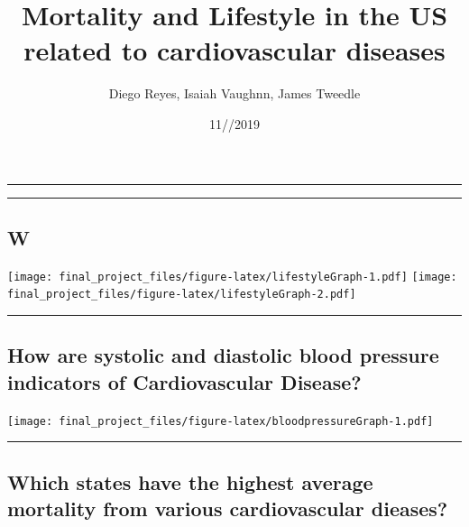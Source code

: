 \documentclass[]{article}
\title{Mortality and Lifestyle in the US related to cardiovascular diseases}
\author{Diego Reyes, Isaiah Vaughnn, James Tweedle}
\date{11//2019}
\begin{document}
\maketitle

\begin{center}\rule{0.5\linewidth}{\linethickness}\end{center}

\begin{center}\rule{0.5\linewidth}{\linethickness}\end{center}

\hypertarget{w}{%
\subsection{W}\label{w}}

\texttt{[image: final\_project\_files/figure-latex/lifestyleGraph-1.pdf]}
\texttt{[image: final\_project\_files/figure-latex/lifestyleGraph-2.pdf]}

\begin{center}\rule{0.5\linewidth}{\linethickness}\end{center}

\hypertarget{how-are-systolic-and-diastolic-blood-pressure-indicators-of-cardiovascular-disease}{%
\subsection{How are systolic and diastolic blood pressure indicators of
Cardiovascular
Disease?}\label{how-are-systolic-and-diastolic-blood-pressure-indicators-of-cardiovascular-disease}}

\texttt{[image: final\_project\_files/figure-latex/bloodpressureGraph-1.pdf]}

\begin{center}\rule{0.5\linewidth}{\linethickness}\end{center}

\hypertarget{which-states-have-the-highest-average-mortality-from-various-cardiovascular-dieases}{%
\subsection{Which states have the highest average mortality from various
cardiovascular
dieases?}\label{which-states-have-the-highest-average-mortality-from-various-cardiovascular-dieases}}
\end{document}
